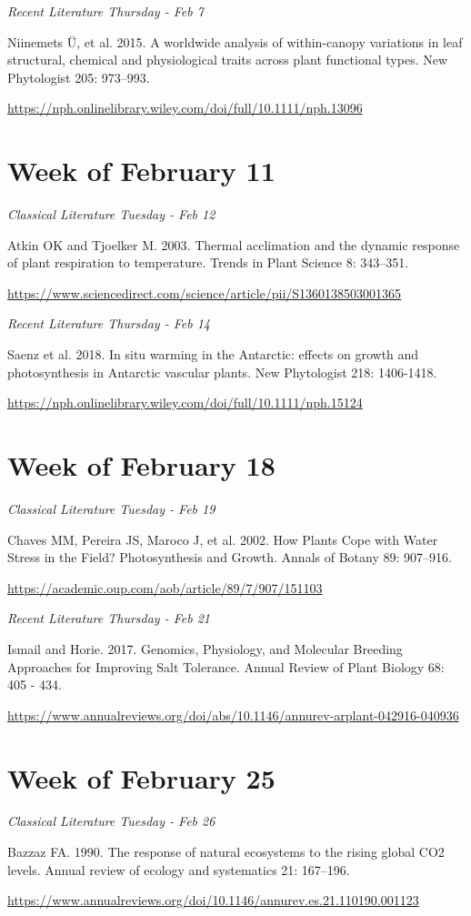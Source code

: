 \documentclass[12pt, notitlepage]{article}   	%
\begin{document}
{\textit{Recent Literature Thursday - Feb 7} \par
Niinemets Ü, et al. 2015. A worldwide analysis of within-canopy variations in leaf 
structural, chemical and physiological traits across plant functional types.
New Phytologist 205: 973–993. \par
\url{https://nph.onlinelibrary.wiley.com/doi/full/10.1111/nph.13096}

\section*{Week of February 11}
\textit{Classical Literature Tuesday - Feb 12} \par
Atkin OK and Tjoelker M. 2003. Thermal acclimation and the dynamic response of plant 
respiration to temperature. Trends in Plant Science 8: 343–351. \par
\url{https://www.sciencedirect.com/science/article/pii/S1360138503001365}

\textit{Recent Literature Thursday - Feb 14} \par
Saenz et al. 2018. In situ warming in the Antarctic: effects on growth and photosynthesis 
in Antarctic vascular plants. New Phytologist 218: 1406-1418. \par
\url{https://nph.onlinelibrary.wiley.com/doi/full/10.1111/nph.15124}

\section*{Week of February 18}
\textit{Classical Literature Tuesday - Feb 19} \par
Chaves MM, Pereira JS, Maroco J, et al. 2002. How Plants Cope with Water Stress 
in the Field? Photosynthesis and Growth. Annals of Botany 89: 907–916. \par
\url{https://academic.oup.com/aob/article/89/7/907/151103}

\textit{Recent Literature Thursday - Feb 21} \par
Ismail and Horie. 2017. Genomics, Physiology, and Molecular Breeding Approaches for 
Improving Salt Tolerance. Annual Review of Plant Biology 68: 405 - 434. \par
\url{https://www.annualreviews.org/doi/abs/10.1146/annurev-arplant-042916-040936}

\section*{Week of February 25}
\textit{Classical Literature Tuesday - Feb 26} \par
Bazzaz FA. 1990. The response of natural ecosystems to the rising global CO2 levels. 
Annual review of ecology and systematics 21: 167–196. \par
\url{https://www.annualreviews.org/doi/10.1146/annurev.es.21.110190.001123}

}
\end{document}
